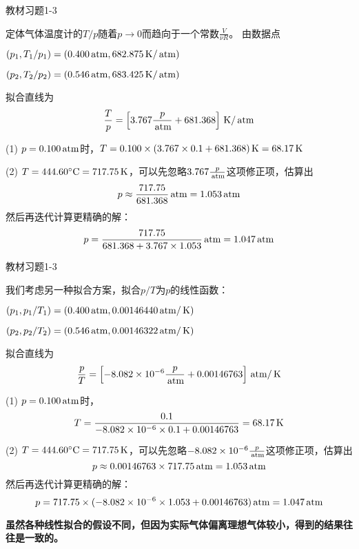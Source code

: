\documentclass[CJK]{beamer}
\begin{document}
\begin{frame}
\bch
{\blue 教材习题1-3}

{\scriptsize
定体气体温度计的$T/p$随着$p\rightarrow 0$而趋向于一个常数$\frac{V}{\nu R}$。
由数据点

$(p_1, T_1/p_1) = (0.400\,\mathrm{atm}, 682.875 \,\mathrm{K}/\,\mathrm{atm})$

$(p_2, T_2/p_2) = (0.546\,\mathrm{atm}, 683.425 \,\mathrm{K}/\,\mathrm{atm})$

拟合直线为
$$\frac{T}{p} = \left[3.767\frac{p}{\,\mathrm{atm}} + 681.368\right]\,\mathrm{K}/\,\mathrm{atm} $$

\bitem
\item[(1)]{$p=0.100\,\mathrm{atm}$时，$T=0.100\times(3.767\times 0.1 + 681.368)\,\mathrm{K} = 68.17\,\mathrm{K}$}
\item[(2)]{$T=444.60^\circ \mathrm{C} = 717.75\,\mathrm{K}$，可以先忽略$3.767\frac{p}{\,\mathrm{atm}} $这项修正项，估算出
$$p \approx {717.75\over 681.368} \,\mathrm{atm} = 1.053\,\mathrm{atm}$$
然后再迭代计算更精确的解：
$$ p = \frac{717.75}{681.368 + 3.767\times 1.053} \,\mathrm{atm} = 1.047 \,\mathrm{atm} $$
}
\eitem
}
\ech
\end{frame}

\begin{frame}
\bch
{\blue 教材习题1-3}

{\scriptsize
我们考虑另一种拟合方案，拟合$p/T$为$p$的线性函数：

$(p_1, p_1/T_1) = (0.400\,\mathrm{atm}, 0.00146440 \,\mathrm{atm}/\,\mathrm{K})$

$(p_2, p_2/T_2) = (0.546\,\mathrm{atm}, 0.00146322  \,\mathrm{atm}/\,\mathrm{K})$

拟合直线为
$$\frac{p}{T} = \left[-8.082\times 10^{-6}\frac{p}{\,\mathrm{atm}} + 0.00146763\right]\,\mathrm{atm}/\,\mathrm{K} $$

\bitem
\item[(1)]{$p=0.100\,\mathrm{atm}$时，
$$T  = \frac{0.1}{-8.082\times 10^{-6}\times 0.1 + 0.00146763} = 68.17\,\mathrm{K}$$
}
\item[(2)]{$T=444.60^\circ \mathrm{C} = 717.75\,\mathrm{K}$，可以先忽略$-8.082\times 10^{-6}\frac{p}{\,\mathrm{atm}} $这项修正项，估算出
$$p \approx 0.00146763\times 717.75 \,\mathrm{atm} = 1.053\,\mathrm{atm}$$
然后再迭代计算更精确的解：
$$ p = 717.75\times(-8.082\times 10^{-6}\times 1.053 + 0.00146763) \,\mathrm{atm} = 1.047 \,\mathrm{atm} $$
}
\eitem

{\bf 虽然各种线性拟合的假设不同，但因为实际气体偏离理想气体较小，得到的结果往往是一致的。}

}

\ech
\end{frame}
\end{document}
